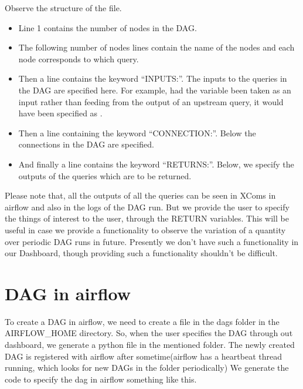 \documentclass[letterpaper,10pt,english]{sphinxmanual}
\begin{document}
Observe the structure of the file.
\begin{itemize}
\item {} 
Line 1 contains the number of nodes in the DAG.

\item {} 
The following number of nodes lines contain the name of the nodes and  each node corresponds to which query.

\item {} 
Then a line contains the keyword “INPUTS:”. The inputs to the queries in the DAG are specified here. For example, had the  variable been taken as an input rather than feeding from the output of an upstream query, it would have been specified as .

\item {} 
Then a line containing the keyword “CONNECTION:”. Below the connections in the DAG are specified.

\item {} 
And finally a line contains the keyword “RETURNS:”. Below, we specify the outputs of the queries which are to be returned.

\end{itemize}

Please note that, all the outputs of all the queries can be seen in XComs in airflow and also in the logs of the DAG run. But we provide the user to specify the things of interest to the user, through the RETURN variables. This will be useful in case we provide a functionality to observe the variation of a quantity over periodic DAG runs in future. Presently we don’t have such a functionality in our Dashboard, though providing such a functionality shouldn’t be difficult.


\section{DAG in airflow}
\label{\detokenize{dag:dag-in-airflow}}
To create a DAG in airflow, we need to create a file in the dags folder in the AIRFLOW\_HOME directory. So, when the user specifies the DAG through out dashboard, we generate a python file in the mentioned folder. The newly created DAG is registered with airflow after sometime(airflow has a heartbeat thread running, which looks for new DAGs in the folder periodically)
We generate the code to specify the dag in airflow something like this.
\end{document}
